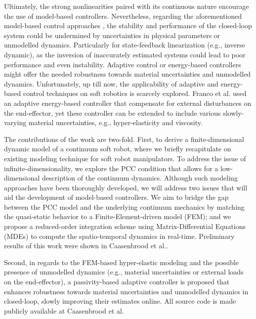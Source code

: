 Ultimately, the strong nonlinearities paired with its continuous nature encourage the use of model-based controllers. Nevertheless, regarding the aforementioned model-based control approaches \cite{Santina2020,Katzschmann2019,Falkenhahn2015}, the stability and performance of the closed-loop system could be undermined by uncertainties in physical parameters or unmodelled dynamics. Particularly for state-feedback linearization (e.g., inverse dynamic), as the inversion of inaccurately estimated systems could lead to poor performance and even instability. Adaptive control \cite{Slotine1988,Morgan1977} or energy-based controllers \cite{Ortega1998} might offer the needed robustness towards material uncertainties and unmodelled dynamics. Unfortunately, up till now, the  applicability of adaptive and energy-based control techniques on soft robotics is scarcely explored. Franco et al. \cite{Franco2020} used an adaptive energy-based controller that compensate for external disturbances on the end-effector, yet these controller can be extended to include various slowly-varying material uncertainties, e.g., hyper-elasticity and viscosity.

The contributions of the work are two-fold. First, to derive a finite-dimensional dynamic model of a continuum soft robot, where we briefly recapitulate on existing modeling technique for soft robot manipulators. To address the issue of infinite-dimensionality, we explore the PCC condition that allows for a low-dimensional description of the continuum dynamics. Although such modeling approaches have been thoroughly developed, we will address two issues that will aid the development of model-based controllers. We aim to bridge the gap between the PCC model and the underlying continuum mechanics by matching the quasi-static behavior to a Finite-Element-driven model (FEM); and we propose a reduced-order integration scheme using Matrix-Differential Equations (MDEs) to compute the spatio-temporal dynamics in real-time. Preliminary results of this work were shown in Caasenbrood et al.\cite{Caasenbrood2020}.
%

Second, in regards to the FEM-based hyper-elastic modeling and the possible presence of unmodelled dynamics (e.g., material uncertainties or external loads on the end-effector), a passivity-based adaptive controller is proposed that enhances robustness towards material uncertainties and unmodelled dynamics in closed-loop, slowly improving their estimates online. All source code is made publicly available at Caasenbrood et al.\cite{Caasenbrood2021} 

